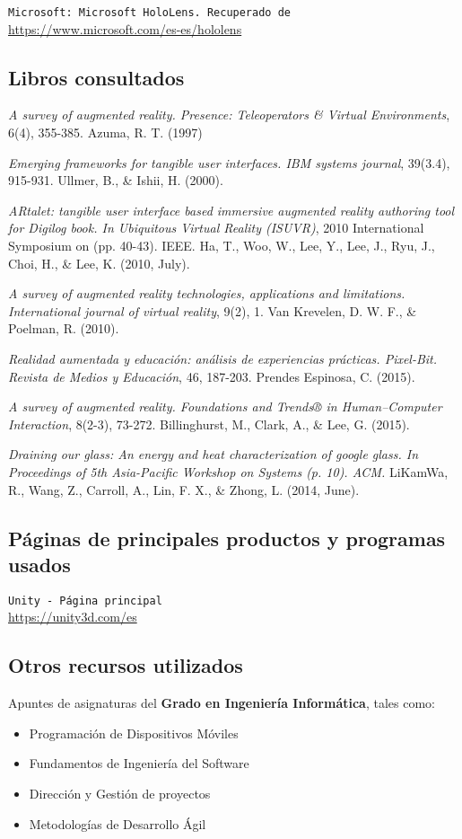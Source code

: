 {\tt Microsoft: Microsoft HoloLens. Recuperado de }\\
\url{https://www.microsoft.com/es-es/hololens}


\subsection*{Libros consultados}

{\em A survey of augmented reality. Presence: Teleoperators & Virtual Environments}, 6(4), 355-385. Azuma, R. T. (1997)

{\em Emerging frameworks for tangible user interfaces. IBM systems journal}, 39(3.4), 915-931. Ullmer, B., & Ishii, H. (2000).

{\em ARtalet: tangible user interface based immersive augmented reality authoring tool for Digilog book. In Ubiquitous Virtual Reality (ISUVR)}, 2010 International Symposium on (pp. 40-43). IEEE. Ha, T., Woo, W., Lee, Y., Lee, J., Ryu, J., Choi, H., & Lee, K. (2010, July).

{\em A survey of augmented reality technologies, applications and limitations. International journal of virtual reality},  9(2), 1. Van Krevelen, D. W. F., & Poelman, R. (2010).

{\em Realidad aumentada y educación: análisis de experiencias prácticas. Pixel-Bit. Revista de Medios y Educación}, 46, 187-203. Prendes Espinosa, C. (2015).

{\em A survey of augmented reality. Foundations and Trends® in Human–Computer Interaction}, 8(2-3), 73-272. Billinghurst, M., Clark, A., & Lee, G. (2015).

{\em Draining our glass: An energy and heat characterization of google glass. In Proceedings of 5th Asia-Pacific Workshop on Systems (p. 10). ACM.} LiKamWa, R., Wang, Z., Carroll, A., Lin, F. X., & Zhong, L. (2014, June).


\subsection*{Páginas de principales productos y programas usados}

 {\tt Unity - Página principal}\\
\url{https://unity3d.com/es}

\subsection*{Otros recursos utilizados}

Apuntes de asignaturas del \textbf{Grado en Ingeniería Informática}, tales como:
\begin{itemize}
    \item Programación de Dispositivos Móviles
    \item Fundamentos de Ingeniería del Software
    \item Dirección y Gestión de proyectos
    \item Metodologías de Desarrollo Ágil
\end{itemize}
